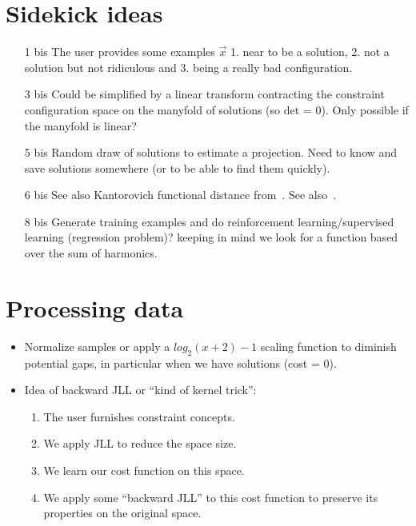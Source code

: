 \documentclass[a4paper, 12pt]{article}
\begin{document}
\section{Sidekick ideas}
\begin{itemize}
\item[1 bis] The user provides some examples $\vec{x}$ 1. near to be a solution, 2. not a solution but not ridiculous and 3. being a really bad configuration.
\item[3 bis] Could be simplified by a linear transform contracting the constraint configuration space on the manyfold of solutions (so det = 0). Only possible if the manyfold is linear?
\item[5 bis] Random draw of solutions to estimate a projection. Need to know and save solutions somewhere (or to be able to find them quickly).
\item [6 bis] See also Kantorovich functional distance from~\cite{StochCP}. See also~\cite{metrics}.
\item [8 bis] Generate training examples and do reinforcement learning/supervised learning (regression problem)? keeping in mind we look for a function based over the sum of harmonics.
\end{itemize}

\section{Processing data}
\begin{itemize}
\item Normalize samples or apply  a $log_2(x+2)-1$ scaling function to
  diminish potential gaps, in particular  when we have solutions (cost
  = 0).
\item Idea of backward JLL or ``kind of kernel trick'':
  \begin{enumerate}
  \item The user furnishes constraint concepts.
  \item We apply JLL to reduce the space size.
  \item We learn our cost function on this space.
  \item  We apply  some  ``backward  JLL'' to  this  cost function  to
    preserve its properties on the original space.
  \end{enumerate}
\end{itemize}
\end{document}
